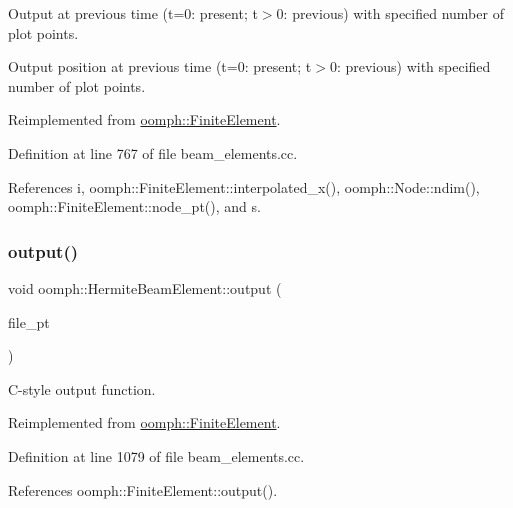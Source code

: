 Output at previous time (t=0\+: present; t$>$0\+: previous) with specified number of plot points. 

Output position at previous time (t=0\+: present; t$>$0\+: previous) with specified number of plot points. 

Reimplemented from \hyperlink{classoomph_1_1FiniteElement_a04d2985868c25a1a9eff3ad6fd459071}{oomph\+::\+Finite\+Element}.



Definition at line 767 of file beam\+\_\+elements.\+cc.



References i, oomph\+::\+Finite\+Element\+::interpolated\+\_\+x(), oomph\+::\+Node\+::ndim(), oomph\+::\+Finite\+Element\+::node\+\_\+pt(), and s.

\mbox{\label{classoomph_1_1HermiteBeamElement_ae47002ab30c8283faa9aebb4af9dc7f3}} 
\subsubsection{\texorpdfstring{output()}{output()}\hspace{0.1cm}{\footnotesize\ttfamily [4/6]}}
{\footnotesize\ttfamily void oomph\+::\+Hermite\+Beam\+Element\+::output (\begin{DoxyParamCaption}\item[{F\+I\+LE $\ast$}]{file\+\_\+pt }\end{DoxyParamCaption})\hspace{0.3cm}{\ttfamily [virtual]}}



C-\/style output function. 



Reimplemented from \hyperlink{classoomph_1_1FiniteElement_a72cddd09f8ddbee1a20a1ff404c6943e}{oomph\+::\+Finite\+Element}.



Definition at line 1079 of file beam\+\_\+elements.\+cc.



References oomph\+::\+Finite\+Element\+::output().

\mbox{\label{classoomph_1_1HermiteBeamElement_a1507819b449418c5e27bb94a7fa08930}} 

